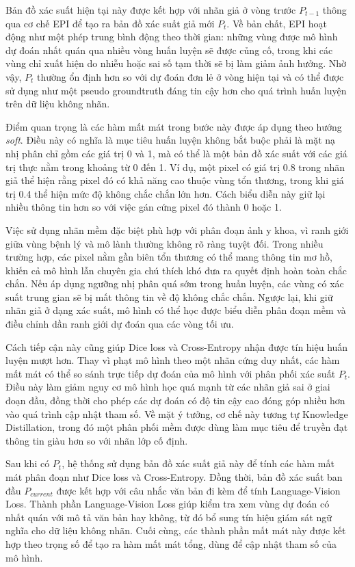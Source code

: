 Bản đồ xác suất hiện tại này được kết hợp với nhãn giả ở vòng trước $P_{t-1}$ thông qua cơ chế EPI để tạo ra bản đồ xác suất giả mới $P_t$. Về bản chất, EPI hoạt động như một phép trung bình động theo thời gian: những vùng được mô hình dự đoán nhất quán qua nhiều vòng huấn luyện sẽ được củng cố, trong khi các vùng chỉ xuất hiện do nhiễu hoặc sai số tạm thời sẽ bị làm giảm ảnh hưởng. Nhờ vậy, $P_t$ thường ổn định hơn so với dự đoán đơn lẻ ở vòng hiện tại và có thể được sử dụng như một pseudo groundtruth đáng tin cậy hơn cho quá trình huấn luyện trên dữ liệu không nhãn.

Điểm quan trọng là các hàm mất mát trong bước này được áp dụng theo hướng \textit{soft}. Điều này có nghĩa là mục tiêu huấn luyện không bắt buộc phải là mặt nạ nhị phân chỉ gồm các giá trị 0 và 1, mà có thể là một bản đồ xác suất với các giá trị thực nằm trong khoảng từ 0 đến 1. Ví dụ, một pixel có giá trị 0.8 trong nhãn giả thể hiện rằng pixel đó có khả năng cao thuộc vùng tổn thương, trong khi giá trị 0.4 thể hiện mức độ không chắc chắn lớn hơn. Cách biểu diễn này giữ lại nhiều thông tin hơn so với việc gán cứng pixel đó thành 0 hoặc 1.

Việc sử dụng nhãn mềm đặc biệt phù hợp với phân đoạn ảnh y khoa, vì ranh giới giữa vùng bệnh lý và mô lành thường không rõ ràng tuyệt đối. Trong nhiều trường hợp, các pixel nằm gần biên tổn thương có thể mang thông tin mơ hồ, khiến cả mô hình lẫn chuyên gia chú thích khó đưa ra quyết định hoàn toàn chắc chắn. Nếu áp dụng ngưỡng nhị phân quá sớm trong huấn luyện, các vùng có xác suất trung gian sẽ bị mất thông tin về độ không chắc chắn. Ngược lại, khi giữ nhãn giả ở dạng xác suất, mô hình có thể học được biểu diễn phân đoạn mềm và điều chỉnh dần ranh giới dự đoán qua các vòng tối ưu.

Cách tiếp cận này cũng giúp Dice loss và Cross-Entropy nhận được tín hiệu huấn luyện mượt hơn. Thay vì phạt mô hình theo một nhãn cứng duy nhất, các hàm mất mát có thể so sánh trực tiếp dự đoán của mô hình với phân phối xác suất $P_t$. Điều này làm giảm nguy cơ mô hình học quá mạnh từ các nhãn giả sai ở giai đoạn đầu, đồng thời cho phép các dự đoán có độ tin cậy cao đóng góp nhiều hơn vào quá trình cập nhật tham số. Về mặt ý tưởng, cơ chế này tương tự Knowledge Distillation, trong đó một phân phối mềm được dùng làm mục tiêu để truyền đạt thông tin giàu hơn so với nhãn lớp cố định.

Sau khi có $P_t$, hệ thống sử dụng bản đồ xác suất giả này để tính các hàm mất mát phân đoạn như Dice loss và Cross-Entropy. Đồng thời, bản đồ xác suất ban đầu $P_{current}$ được kết hợp với câu nhắc văn bản đi kèm để tính Language-Vision Loss. Thành phần Language-Vision Loss giúp kiểm tra xem vùng dự đoán có nhất quán với mô tả văn bản hay không, từ đó bổ sung tín hiệu giám sát ngữ nghĩa cho dữ liệu không nhãn. Cuối cùng, các thành phần mất mát này được kết hợp theo trọng số để tạo ra hàm mất mát tổng, dùng để cập nhật tham số của mô hình.

